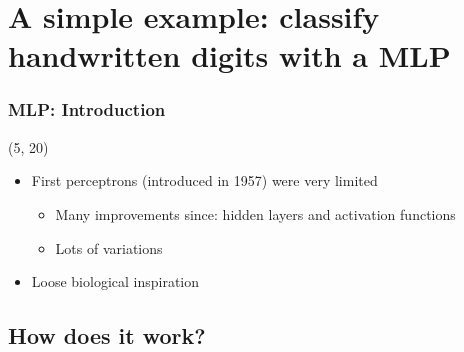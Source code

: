 \section[A simple example: MLP]{A simple example: classify handwritten digits with a \acl{MLP}}

\begin{frame}

  \frametitle{\acl{MLP}: Introduction}

  \begin{textblock}{80}(5, 20)
    \begin{itemize}
    \item<1-> First perceptrons (introduced in 1957) were very limited
      \begin{itemize}
      \item Many improvements since: hidden layers and activation functions
      \item Lots of variations
      \end{itemize}
    \item<1-> Loose biological inspiration
    \end{itemize}
  \end{textblock}
\end{frame}


\subsection{How does it work?}

